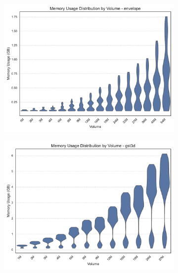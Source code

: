\begin{figure}[htbp]
    \centering
    \begin{subfigure}[t]{0.49\textwidth}
        \centering
        \includegraphics[width=\textwidth]{assets/images/05/memory_usage_distribution_envelope}
    \end{subfigure}
    \hfill
    \begin{subfigure}[t]{0.49\textwidth}
        \centering
        \includegraphics[width=\textwidth]{assets/images/05/memory_usage_distribution_gst3d}
    \end{subfigure}
    \hfill
    \begin{subfigure}[t]{0.49\textwidth}
        \centering

\end{subfigure}
\end{figure}
